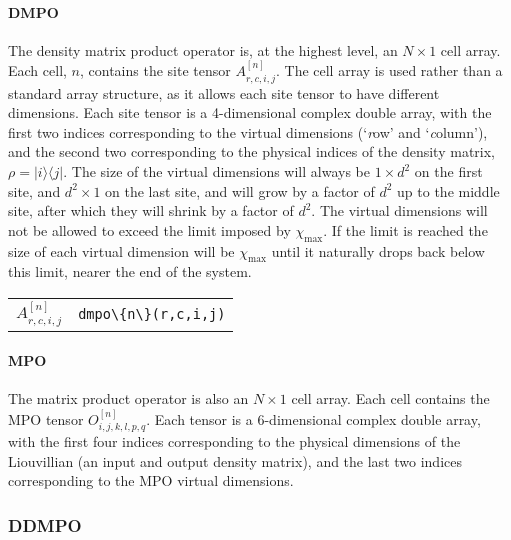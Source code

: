  \paragraph{DMPO} 
 The density matrix product operator is, at the highest level, an \(N \times 1\) cell array. Each cell, \(n\), contains the site tensor \(A^{[n]}_{r,c,i,j}\). The cell array is used rather than a standard array structure, as it allows each site tensor to have different dimensions. Each site tensor is a 4-dimensional complex double array, with the first two indices corresponding to the virtual dimensions (`\emph{r}ow' and `\emph{c}olumn'), and the second two corresponding to the physical indices of the density matrix, \(\rho = |i \rangle \langle j|\). The size of the virtual dimensions will always be \(1 \times d^{2}\) on the first site, and \(d^{2} \times 1\) on the last site, and will grow by a factor of \(d^{2}\) up to the middle site, after which they will shrink by a factor of \(d^{2}\). The virtual dimensions will not be allowed to exceed the limit imposed by \(\chi_{\mathrm{max}}\). If the limit is reached the size of each virtual dimension will be \(\chi_{\mathrm{max}}\) until it naturally drops back below this limit, nearer the end of the system. 

 \begin{tabu} to \linewidth {X[c]|X[c]}
  	\(A^{[n]}_{r,c,i,j}\) & \lstinline$dmpo\{n\}(r,c,i,j)$
 \end{tabu}

\paragraph{MPO}
The matrix product operator is also an \(N \times 1\) cell array. Each cell contains the MPO tensor \(O^{[n]}_{i,j,k,l,p,q}\). Each tensor is a 6-dimensional complex double array, with the first four indices corresponding to the physical dimensions of the Liouvillian (an input and output density matrix), and the last two indices corresponding to the MPO virtual dimensions.
 
 \subsubsection{DDMPO}
